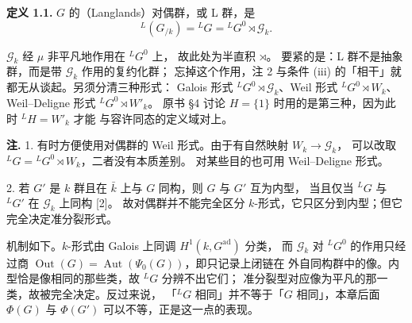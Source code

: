 \par\medskip\noindent\textbf{定义 1.1.}\quad
$G$ 的（Langlands）对偶群，或 L 群，是
\[
  {}^{L}(G_{/k})={}^{L}G={}^{L}G^{0}\rtimes\mathcal{G}_k.
\]
\begin{annote}
$\mathcal{G}_k$ 经 $\mu$ 非平凡地作用在 ${}^{L}G^{0}$ 上，
故此处为半直积 $\rtimes$。
要紧的是：L 群不是抽象群，而是带 $\mathcal{G}_k$ 作用的复约化群；
忘掉这个作用，注 2 与条件 (iii) 的「相干」就都无从谈起。另须分清三种形式：
Galois 形式 ${}^{L}G^{0}\rtimes\mathcal{G}_k$、Weil 形式
${}^{L}G^{0}\rtimes W_k$、Weil--Deligne 形式 ${}^{L}G^{0}\rtimes W'_k$。
原书 §4 讨论 $H=\{1\}$ 时用的是第三种，因为此时 ${}^{L}H=W'_k$ 才能
与容许同态的定义域对上。
\par{}
\end{annote}

\par\medskip\noindent\textbf{注.}
1. 有时方便使用对偶群的 Weil 形式。由于有自然映射 $W_k\to\mathcal{G}_k$，
可以改取 ${}^{L}G={}^{L}G^{0}\rtimes W_k$，二者没有本质差别。
对某些目的也可用 Weil--Deligne 形式。

2. 若 $G'$ 是 $k$ 群且在 $\bar k$ 上与 $G$ 同构，则 $G$ 与 $G'$ 互为内型，
当且仅当 ${}^{L}G$ 与 ${}^{L}G'$ 在 $\mathcal{G}_k$ 上同构 [2]。
故对偶群并不能完全区分 $k$-形式，它只区分到内型；但它完全决定准分裂形式。
\begin{annote}
机制如下。$k$-形式由 Galois 上同调 $H^1(k,G^{\mathrm{ad}})$ 分类，
而 $\mathcal{G}_k$ 对 ${}^{L}G^{0}$ 的作用只经过商
$\operatorname{Out}(G)=\operatorname{Aut}(\Psi_0(G))$，即只记录上闭链在
外自同构群中的像。内型恰是像相同的那些类，故 ${}^{L}G$ 分辨不出它们；
准分裂型对应像为平凡的那一类，故被完全决定。反过来说，
「${}^{L}G$ 相同」并不等于「$G$ 相同」，本章后面 $\Phi(G)$ 与 $\Phi(G')$
可以不等，正是这一点的表现。
\par{}
\end{annote}

